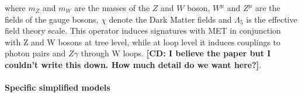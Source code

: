 where $m_Z$ and $m_W$ are the masses of the $Z$ and $W$ boson, $W^{\mu}$ and $Z^{\mu}$
are the fields of the gauge bosons, $\chi$ denote the Dark Matter fields 
and $\Lambda_5$ is the effective field theory scale. This operator 
induces signatures with MET in conjunction with Z and W bosons at tree level,
while at loop level it induces couplings to photon pairs and $Z \gamma$ through W loops. 
\textbf{[CD: I believe the paper but I couldn't write this down. How much detail do we want here?]}. 







\paragraph{Specific simplified models}




